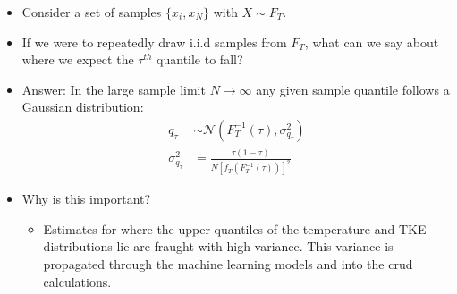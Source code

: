 \documentclass[t, pdftex]{beamer}
\begin{document}
\begin{frame}
\begin{itemize}
\item Consider a set of samples $\{x_i, x_N \}$ with $X \sim F_T$.
\item If we were to repeatedly draw i.i.d samples from $F_T$, what can we say about where we expect the $\tau^{th}$ quantile to fall?
\item Answer:  In the large sample limit $N \rightarrow \infty$ any given sample quantile follows a Gaussian distribution:
\begin{align}
q_\tau &\sim \mathcal N \left( F_T^{-1}(\tau), \sigma^2_{q_\tau} \right) \nonumber \\
\sigma^2_{q_\tau} &= \frac{\tau(1 - \tau)}{N[f_T(F_T^{-1}(\tau))]^2} \nonumber
\label{eq:theory_qdist_1}
\end{align}

\item Why is this important?
\begin{itemize}
\item Estimates for where the upper quantiles of the temperature and TKE distributions lie are fraught with high variance.  This variance is propagated through the machine learning models and into the crud calculations.
\end{itemize}
\end{itemize}
\cite{mosteller1946}
\end{frame}
\end{document}
